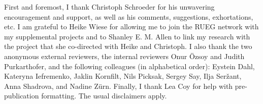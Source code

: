 \documentclass[output=paper,colorlinks,citecolor=brown]{langscibook}
\begin{document}
First and foremost, I thank Christoph Schroeder for his unwavering encouragement and support, as well as his comments, suggestions, exhortations, etc. I am grateful to Heike Wiese for allowing me to join the RUEG network with my supplemental projects and to Shanley E. M. Allen to link my research with the project that she co-directed with Heike and Christoph. I also thank the two anonymous external reviewers, the internal reviewers Onur Özsoy and Judith Purkarthofer, and the following colleagues (in alphabetical order): Eystein Dahl, Kateryna Iefremenko, Jaklin Kornfilt, Nils Picksak, Sergey Say, Ilja Seržant, Anna Shadrova, and Nadine Zürn. Finally, I thank Lea Coy for help with pre-publication formatting. The usual disclaimers apply.

\printbibliography[heading=subbibliography,notkeyword=this]
\end{document}
